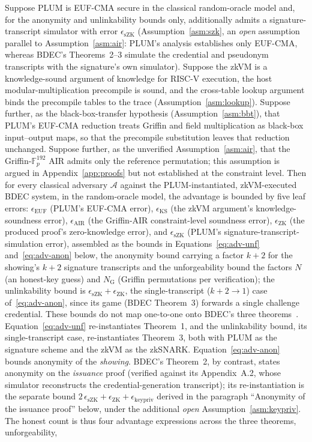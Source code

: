 \begin{theorem}\label{thm:security-preserve}
    Suppose PLUM is EUF-CMA secure in the classical random-oracle model and, for the anonymity and unlinkability bounds only, additionally admits a signature-transcript simulator with error $\epsilon_{\mathrm{sZK}}$ (Assumption~\ref{asm:szk}, an \emph{open} assumption parallel to Assumption~\ref{asm:air}: PLUM's analysis establishes only EUF-CMA, whereas BDEC's Theorems~2--3 simulate the credential and pseudonym transcripts with the signature's own simulator). Suppose the zkVM is a knowledge-sound argument of knowledge for RISC-V execution, the host modular-multiplication precompile is sound, and the cross-table lookup argument binds the precompile tables to the trace (Assumption~\ref{asm:lookup}). Suppose further, as the black-box-transfer hypothesis (Assumption~\ref{asm:bbt}), that PLUM's EUF-CMA reduction treats Griffin and field multiplication as black-box input--output maps, so that the precompile substitution leaves that reduction unchanged. Suppose further, as the unverified Assumption~\ref{asm:air}, that the Griffin-$\mathbb{F}_p^{192}$ AIR admits only the reference permutation; this assumption is argued in Appendix~\ref{app:proofs} but not established at the constraint level. Then for every classical adversary $\mathcal{A}$ against the PLUM-instantiated, zkVM-executed BDEC system, in the random-oracle model, the advantage is bounded by five leaf errors: $\epsilon_{\mathrm{EUF}}$ (PLUM's EUF-CMA error), $\epsilon_{\mathrm{KS}}$ (the zkVM argument's knowledge-soundness error), $\epsilon_{\mathrm{AIR}}$ (the Griffin-AIR constraint-level soundness error), $\epsilon_{\mathrm{ZK}}$ (the produced proof's zero-knowledge error), and $\epsilon_{\mathrm{sZK}}$ (PLUM's signature-transcript-simulation error), assembled as the bounds in Equations~\eqref{eq:adv-unf} and~\eqref{eq:adv-anon} below, the anonymity bound carrying a factor $k+2$ for the showing's $k+2$ signature transcripts and the unforgeability bound the factors $N$ (an honest-key guess) and $N_{\mathrm G}$ (Griffin permutations per verification); the unlinkability bound is $\epsilon_{\mathrm{sZK}}+\epsilon_{\mathrm{ZK}}$, the single-transcript ($k+2\to1$) case of~\eqref{eq:adv-anon}, since its game (BDEC Theorem~3) forwards a single challenge credential. These bounds do not map one-to-one onto BDEC's three theorems~\cite{10.1007/978-981-96-0957-4_3}. Equation~\eqref{eq:adv-unf} re-instantiates Theorem~1, and the unlinkability bound, its single-transcript case, re-instantiates Theorem~3, both with PLUM as the signature scheme and the zkVM as the zkSNARK. Equation~\eqref{eq:adv-anon} bounds anonymity of the \emph{showing}. BDEC's Theorem~2, by contrast, states anonymity on the \emph{issuance} proof (verified against its Appendix~A.2, whose simulator reconstructs the credential-generation transcript); its re-instantiation is the separate bound $2\,\epsilon_{\mathrm{sZK}}+\epsilon_{\mathrm{ZK}}+\epsilon_{\mathrm{keypriv}}$ derived in the paragraph ``Anonymity of the issuance proof'' below, under the additional \emph{open} Assumption~\ref{asm:keypriv}. The honest count is thus four advantage expressions across the three theorems, unforgeability, 
\end{theorem}
